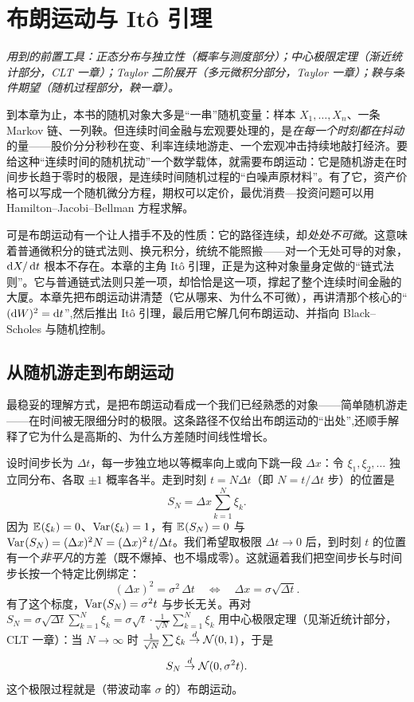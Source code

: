 \chapter{布朗运动与 Itô 引理}
\label{ch:brownian}

\noindent\emph{用到的前置工具：正态分布与独立性（概率与测度部分）；中心极限定理（渐近统计部分，CLT 一章）；Taylor 二阶展开（多元微积分部分，Taylor 一章）；鞅与条件期望（随机过程部分，鞅一章）。}
\medskip

到本章为止，本书的随机对象大多是``一串''随机变量：样本 $X_1,\dots,X_n$、一条 Markov 链、一列鞅。但连续时间金融与宏观要处理的，是\emph{在每一个时刻都在抖动}的量——股价分分秒秒在变、利率连续地游走、一个宏观冲击持续地敲打经济。要给这种``连续时间的随机扰动''一个数学载体，就需要布朗运动：它是随机游走在时间步长趋于零时的极限，是连续时间随机过程的``白噪声原材料''。有了它，资产价格可以写成一个随机微分方程，期权可以定价，最优消费—投资问题可以用 Hamilton–Jacobi–Bellman 方程求解。

可是布朗运动有一个让人措手不及的性质：它的路径连续，却\emph{处处不可微}。这意味着普通微积分的链式法则、换元积分，统统不能照搬——对一个无处可导的对象，$\mathop{}\!\mathrm{d} X/\mathop{}\!\mathrm{d} t$ 根本不存在。本章的主角 Itô 引理，正是为这种对象量身定做的``链式法则''。它与普通链式法则只差一项，却恰恰是这一项，撑起了整个连续时间金融的大厦。本章先把布朗运动讲清楚（它从哪来、为什么不可微），再讲清那个核心的``$(\mathop{}\!\mathrm{d} W)^2=\mathop{}\!\mathrm{d} t$'',然后推出 Itô 引理，最后用它解几何布朗运动、并指向 Black–Scholes 与随机控制。

\section{从随机游走到布朗运动}
\label{sec:brownian-1}

最稳妥的理解方式，是把布朗运动看成一个我们已经熟悉的对象——简单随机游走——在时间被无限细分时的极限。这条路径不仅给出布朗运动的``出处'',还顺手解释了它为什么是高斯的、为什么方差随时间线性增长。

设时间步长为 $\Delta t$，每一步独立地以等概率向上或向下跳一段 $\Delta x$：令 $\xi_1,\xi_2,\dots$ 独立同分布、各取 $\pm1$ 概率各半。走到时刻 $t=N\Delta t$（即 $N=t/\Delta t$ 步）的位置是
\[
    S_N=\Delta x\sum_{k=1}^{N}\xi_k .
\]
因为 $\mathbb{E}_{}\!\left(\xi_k\right)=0$、$\operatorname{Var}_{}\!\left(\xi_k\right)=1$，有 $\mathbb{E}_{}\!\left(S_N\right)=0$ 与 $\operatorname{Var}_{}\!\left(S_N\right)=(\Delta x)^2 N=(\Delta x)^2\,t/\Delta t$。我们希望取极限 $\Delta t\to0$ 后，到时刻 $t$ 的位置有一个\emph{非平凡}的方差（既不爆掉、也不塌成零）。这就逼着我们把空间步长与时间步长按一个特定比例绑定：
\[
    (\Delta x)^2=\sigma^2\,\Delta t
    \quad\Longleftrightarrow\quad
    \Delta x=\sigma\sqrt{\Delta t}.
\]
有了这个标度，$\operatorname{Var}_{}\!\left(S_N\right)=\sigma^2 t$ 与步长无关。再对 $S_N=\sigma\sqrt{\Delta t}\sum_{k=1}^N\xi_k=\sigma\sqrt{t}\cdot\frac{1}{\sqrt N}\sum_{k=1}^N\xi_k$ 用中心极限定理（见渐近统计部分，CLT 一章）：当 $N\to\infty$ 时 $\frac{1}{\sqrt N}\sum\xi_k\overset{d}{\to}\mathcal{N}(0,1)$，于是
\[
    S_N\overset{d}{\to} \mathcal{N}(0,\sigma^2 t).
\]
这个极限过程就是（带波动率 $\sigma$ 的）布朗运动。

